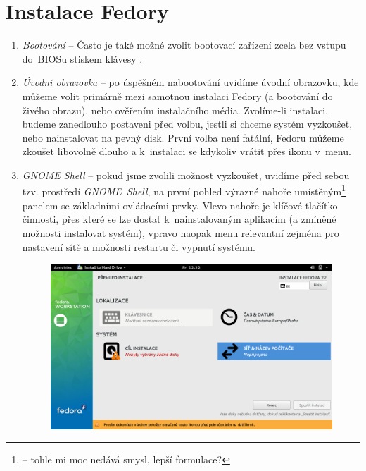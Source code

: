 \section*{Instalace Fedory}
\begin{enumerate}

\item\emph{Bootování} --  Často je také možné zvolit bootovací zařízení zcela bez vstupu do~BIOSu stiskem klávesy .

\item\emph{Úvodní obrazovka} -- po úspěšném nabootování uvidíme úvodní obrazovku, kde můžeme volit primárně mezi samotnou instalaci Fedory (a bootování do živého obrazu), nebo ověřením instalačního média. Zvolíme-li instalaci, budeme zanedlouho postaveni před volbu, jestli si chceme systém vyzkoušet, nebo nainstalovat na pevný disk. První volba není fatální, Fedoru můžeme zkoušet libovolně dlouho a k~instalaci se kdykoliv vrátit přes ikonu v~menu.

\item\emph{GNOME Shell} -- pokud jsme zvolili možnost vyzkoušet, uvidíme před sebou tzv. prostředí \emph{GNOME~Shell}, na první pohled výrazné nahoře umístěným\footnote{ -- tohle mi moc nedává smysl, lepší formulace?}%
panelem se základními ovládacími prvky. Vlevo nahoře je klíčové tlačítko činnosti, přes které se lze dostat k~nainstalovaným aplikacím (a zmíněné možnosti instalovat systém), vpravo naopak menu relevantní zejména pro nastavení sítě a možnosti restartu či vypnutí systému.

\begin{figure}[t]
\begin{center}
\includegraphics[width=\textwidth]{img/instalator-b}
 \label{fig:instalator-b}
\end{center}
\end{figure}


\end{enumerate}
